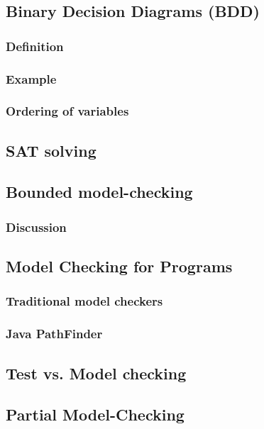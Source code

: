 \documentclass[12pt, a4paper]{book}
\begin{document}
  \subsection{Binary Decision Diagrams (BDD)}
  \label{sub:Binary Decision Diagrams (BDD)}
  \subsubsection{Definition}
  \label{subs:Definition}
  \subsubsection{Example}
  \label{subs:Example}
  \subsubsection{Ordering of variables}
  \label{subs:Ordering of variables}
  \subsection{SAT solving}
  \label{sub:SAT solving}
  \subsection{Bounded model-checking}
  \label{sub:Bounded model-checking}
  \subsubsection{Discussion}
  \label{subs:Discussion}
  \subsection{Model Checking for Programs}
  \label{sub:Model Checking for Programs}
  \subsubsection{Traditional model checkers}
  \label{subs:Traditional model checkers}
  \subsubsection{Java PathFinder}
  \label{subs:Java PathFinder}
  \subsection{Test vs. Model checking}
  \label{sub:Test vs. Model checking}
  \subsection{Partial Model-Checking}
  \label{sub:Partial Model-Checking}
\end{document}
